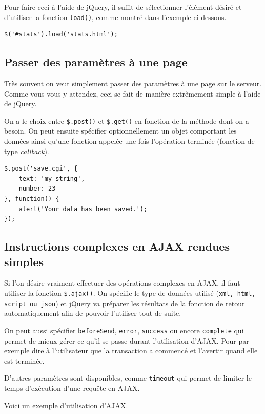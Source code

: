 \documentclass[10pt,a4paper,titlepage]{article}
\begin{document}
Pour faire ceci à l'aide de jQuery, il suffit de sélectionner l'élément désiré et d'utiliser la fonction \texttt{load()}, comme montré dans l'exemple ci dessous. 

\begin{lstlisting}
$('#stats').load('stats.html');
\end{lstlisting}


\subsection{Passer des paramètres à une page}

Très souvent on veut simplement passer des paramètres à une page sur le serveur. Comme vous vous y attendez, ceci se fait de manière extrêmement simple à l'aide de jQuery. 

On a le choix entre \texttt{\$.post()} et \texttt{\$.get()} en fonction de la méthode dont on a besoin. On peut ensuite spécifier optionnellement un objet comportant les données ainsi qu'une fonction appelée une fois l'opération terminée (fonction de type \emph{callback}).

\begin{lstlisting}
$.post('save.cgi', {
    text: 'my string',
    number: 23
}, function() {
    alert('Your data has been saved.');
});
\end{lstlisting}
                                   
\subsection{Instructions complexes en AJAX rendues simples}

Si l'on désire vraiment effectuer des opérations complexes en AJAX, il faut utiliser la fonction \texttt{\$.ajax()}. On spécifie le type de données utilisé (\texttt{xml, html, script ou json}) et jQuery va préparer les résultats de la fonction de retour automatiquement afin de pouvoir l'utiliser tout de suite. 

On peut aussi spécifier \texttt{beforeSend}, \texttt{error}, \texttt{success} ou encore \texttt{complete} qui permet de mieux gérer ce qu'il se passe durant l'utilisation d'AJAX. Pour par exemple dire à l'utilisateur que la transaction a commencé et l'avertir quand elle est terminée.

D'autres paramètres sont disponibles, comme \texttt{timeout} qui permet de limiter le temps d'exécution d'une requête en AJAX.

Voici un exemple d'utilisation d'AJAX. 
\end{document}
